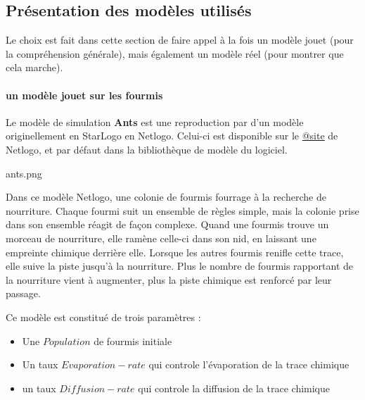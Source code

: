 
%

%


\subsection{Présentation des modèles utilisés}

Le choix est fait dans cette section de faire appel à la fois un modèle jouet (pour la compréhension générale), mais également un modèle réel (pour montrer que cela marche).  

\paragraph{un modèle jouet sur les fourmis}

Le modèle de simulation \textbf{Ants} est une reproduction par \textcite{Wilensky1997} d'un modèle originellement en StarLogo en Netlogo. Celui-ci est disponible sur le \href{http://ccl.northwestern.edu/netlogo/models/Ants}{@site} de Netlogo, et par défaut dans la bibliothèque de modèle du logiciel.

ants.png

Dans ce modèle Netlogo, une colonie de fourmis fourrage à la recherche de nourriture. Chaque fourmi suit un ensemble de règles simple, mais la colonie prise dans son ensemble réagit de façon complexe. Quand une fourmis trouve un morceau de nourriture, elle ramène celle-ci dans son nid, en laissant une empreinte chimique derrière elle. Lorsque les autres fourmis renifle cette trace, elle suive la piste jusqu'à la nourriture. Plus le nombre de fourmis rapportant de la nourriture vient à augmenter, plus la piste chimique est renforcé par leur passage. 

Ce modèle est constitué de trois paramètres : 

\begin{itemize}[label=\textbullet]
\item Une $Population$ de fourmis initiale
\item Un taux $Evaporation-rate$ qui controle l'évaporation de la trace chimique 
\item un taux $Diffusion-rate$ qui controle la diffusion de la trace chimique
\end{itemize}

